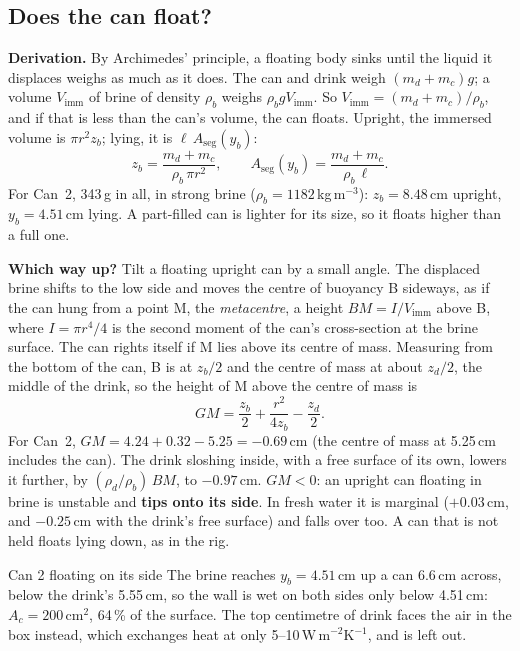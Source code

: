 \documentclass[11pt,a4paper]{article}
\newcommand{\Aseg}{A_{\mathrm{seg}}}
\newcommand{\para}[1]{\par\smallskip\noindent\textbf{#1}\enspace}
\begin{document}
\subsection{Does the can float?}
\para{Derivation.} By Archimedes' principle, a floating body sinks until the liquid it displaces weighs as
much as it does. The can and drink weigh $(m_d + m_c)g$; a volume $V_{\mathrm{imm}}$ of brine of density
$\rho_b$ weighs $\rho_bgV_{\mathrm{imm}}$. So $V_{\mathrm{imm}} = (m_d + m_c)/\rho_b$, and if that is less than
the can's volume, the can floats. Upright, the immersed volume is $\pi r^2z_b$; lying, it is $\ell\,\Aseg(y_b)$:
\begin{equation}
z_b = \frac{m_d + m_c}{\rho_b\,\pi r^2},\qquad \Aseg(y_b) = \frac{m_d + m_c}{\rho_b\,\ell}. \label{eq:s9-float}
\end{equation}
For Can~2, 343\,g in all, in strong brine ($\rho_b = 1182$\,kg\,m$^{-3}$): $z_b = 8.48$\,cm upright,
$y_b = 4.51$\,cm lying. A part-filled can is lighter for its size, so it floats higher than a full one.

\para{Which way up?} Tilt a floating upright can by a small angle. The displaced brine shifts to the low
side and moves the centre of buoyancy B sideways, as if the can hung from a point M, the
\emph{metacentre}, a height $BM = I/V_{\mathrm{imm}}$ above B, where $I = \pi r^4/4$ is the second moment of
the can's cross-section at the brine surface. The can rights itself if M lies above its centre of mass.
Measuring from the bottom of the can, B is at $z_b/2$ and the centre of mass at about $z_d/2$, the middle of
the drink, so the height of M above the centre of mass is
\begin{equation}
GM = \frac{z_b}{2} + \frac{r^2}{4z_b} - \frac{z_d}{2} . \label{eq:s9-GM}
\end{equation}
For Can~2, $GM = 4.24 + 0.32 - 5.25 = -0.69$\,cm (the centre of mass at 5.25\,cm includes the can). The drink
sloshing inside, with a free surface of its own, lowers it further, by $(\rho_d/\rho_b)\,BM$, to $-0.97$\,cm.
$GM < 0$: an upright can floating in brine is unstable and \textbf{tips onto its side}. In fresh water it is
marginal ($+0.03$\,cm, and $-0.25$\,cm with the drink's free surface) and falls over too. A can that is not
held floats lying down, as in the rig.

\begin{worked}{Can 2 floating on its side}
The brine reaches $y_b = 4.51$\,cm up a can 6.6\,cm across, below the drink's 5.55\,cm, so the wall is wet on
both sides only below 4.51\,cm: $A_c = 200$\,cm$^2$, 64\,\% of the surface. The top centimetre of drink faces
the air in the box instead, which exchanges heat at only 5--10\,W\,m$^{-2}$K$^{-1}$, and is left out.
\end{worked}
\end{document}

